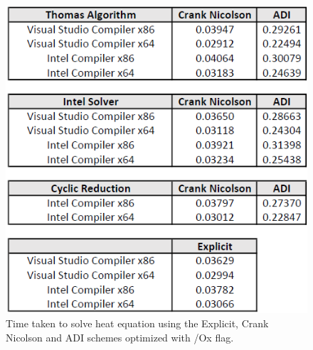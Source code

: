 \documentclass[12pt, oneside]{book}
\theoremstyle{plain}
\theoremstyle{definition}
\begin{document}
\begin{figure}[!htb]
    \centering
        \includegraphics[scale=0.6]{heatXOptimized.png}
    \caption{Time taken to solve heat equation using the Explicit, Crank Nicolson and ADI schemes  optimized with /Ox flag.}
\end{figure}
\end{document}
